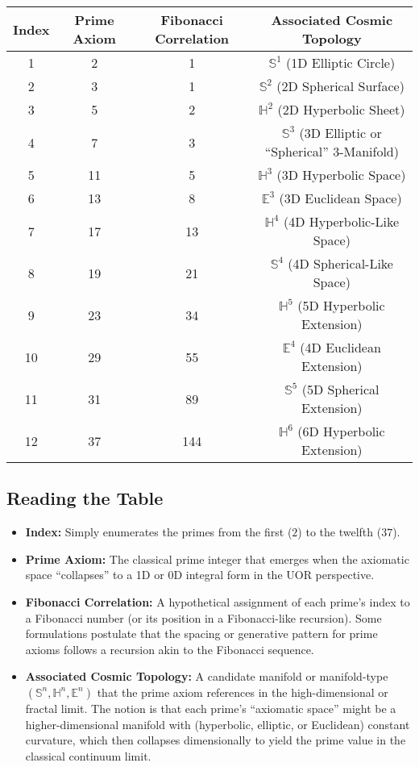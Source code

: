 \documentclass[11pt]{article}
\begin{document}
\begin{center}
\renewcommand{\arraystretch}{1.3}
\begin{tabular}{c c c c}
\toprule
\textbf{Index} & \textbf{Prime Axiom} & \textbf{Fibonacci Correlation} & \textbf{Associated Cosmic Topology} \\
\midrule
1 & 2 & 1 & \(\mathbb{S}^1\) (1D Elliptic Circle) \\
2 & 3 & 1 & \(\mathbb{S}^2\) (2D Spherical Surface) \\
3 & 5 & 2 & \(\mathbb{H}^2\) (2D Hyperbolic Sheet) \\
4 & 7 & 3 & \(\mathbb{S}^3\) (3D Elliptic or ``Spherical'' 3-Manifold) \\
5 & 11 & 5 & \(\mathbb{H}^3\) (3D Hyperbolic Space) \\
6 & 13 & 8 & \(\mathbb{E}^3\) (3D Euclidean Space) \\
7 & 17 & 13 & \(\mathbb{H}^4\) (4D Hyperbolic-Like Space) \\
8 & 19 & 21 & \(\mathbb{S}^4\) (4D Spherical-Like Space) \\
9 & 23 & 34 & \(\mathbb{H}^5\) (5D Hyperbolic Extension) \\
10 & 29 & 55 & \(\mathbb{E}^4\) (4D Euclidean Extension) \\
11 & 31 & 89 & \(\mathbb{S}^5\) (5D Spherical Extension) \\
12 & 37 & 144 & \(\mathbb{H}^6\) (6D Hyperbolic Extension) \\
\bottomrule
\end{tabular}
\end{center}

\subsection*{Reading the Table}
\begin{itemize}
\item \textbf{Index:} Simply enumerates the primes from the first (\(2\)) to the twelfth (\(37\)).
\item \textbf{Prime Axiom:} The classical prime integer that emerges when the axiomatic space ``collapses'' to a 1D or 0D integral form in the UOR perspective.
\item \textbf{Fibonacci Correlation:} A hypothetical assignment of each prime's index to a Fibonacci number (or its position in a Fibonacci-like recursion).  Some formulations postulate that the spacing or generative pattern for prime axioms follows a recursion akin to the Fibonacci sequence.
\item \textbf{Associated Cosmic Topology:} A candidate manifold or manifold-type \((\mathbb{S}^n, \mathbb{H}^n, \mathbb{E}^n)\) that the prime axiom references in the high-dimensional or fractal limit.  The notion is that each prime's ``axiomatic space'' might be a higher-dimensional manifold with (hyperbolic, elliptic, or Euclidean) constant curvature, which then collapses dimensionally to yield the prime value in the classical continuum limit.
\end{itemize}
\end{document}
